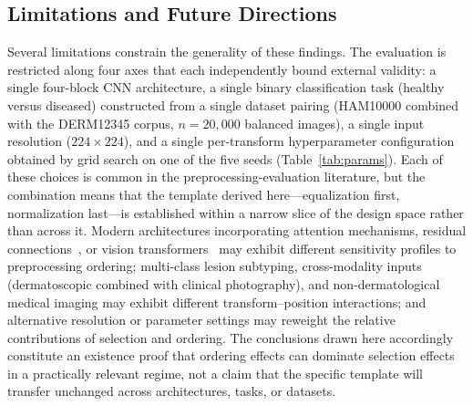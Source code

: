 \documentclass[preprint,5p,times,twocolumn]{elsarticle}
\begin{document}
\subsection{Limitations and Future Directions}
\label{subsec:limitations}

Several limitations constrain the generality of these findings. The evaluation is restricted along four axes that each independently bound external validity: a single four-block CNN architecture, a single binary classification task (healthy versus diseased) constructed from a single dataset pairing (HAM10000 combined with the DERM12345 corpus, $n = 20{,}000$ balanced images), a single input resolution ($224 \times 224$), and a single per-transform hyperparameter configuration obtained by grid search on one of the five seeds (Table~\ref{tab:params}). Each of these choices is common in the preprocessing-evaluation literature, but the combination means that the template derived here---equalization first, normalization last---is established within a narrow slice of the design space rather than across it. Modern architectures incorporating attention mechanisms, residual connections~\cite{He2016}, or vision transformers~\cite{Dosovitskiy2021} may exhibit different sensitivity profiles to preprocessing ordering; multi-class lesion subtyping, cross-modality inputs (dermatoscopic combined with clinical photography), and non-dermatological medical imaging may exhibit different transform--position interactions; and alternative resolution or parameter settings may reweight the relative contributions of selection and ordering. The conclusions drawn here accordingly constitute an existence proof that ordering effects can dominate selection effects in a practically relevant regime, not a claim that the specific template will transfer unchanged across architectures, tasks, or datasets.
\end{document}
